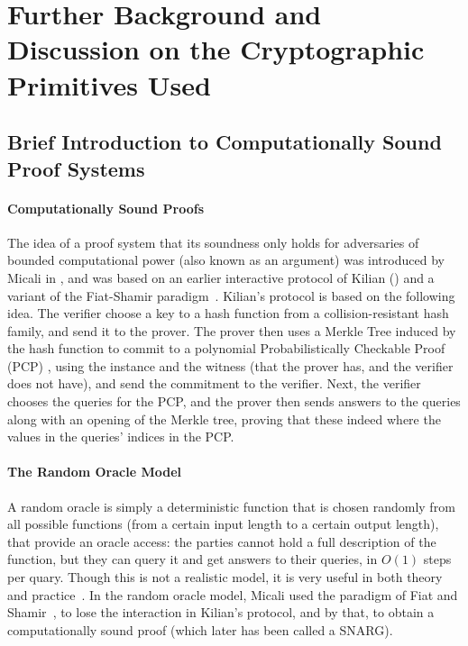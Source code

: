 \section{Further Background and Discussion on the Cryptographic Primitives Used}
\label{app:crypto}
\subsection{Brief Introduction to Computationally Sound Proof Systems}\label{app:crypto:background}
\paragraph{Computationally Sound Proofs}
The idea of a proof system that its soundness only holds for adversaries of bounded computational power (also known as an argument) was introduced by Micali in \cite{micali2000computationally}, and was based on an earlier interactive protocol of Kilian (\cite{kilian1992note}) and a variant of the Fiat-Shamir paradigm~\cite{fiat1986prove}.
Kilian's protocol is based on the following idea. The verifier choose a key to a hash function from a collision-resistant hash family, and send it to the prover. The prover then uses a Merkle Tree \cite{merkle1989certified} induced by the hash function to commit to a polynomial Probabilistically Checkable Proof (PCP) \cite{babai1991checking, arora1998probabilistic, arora1998proof, feige1991approximating}, using the instance and the witness (that the prover has, and the verifier does not have), and send the commitment to the verifier. Next, the verifier chooses the queries for the PCP, and the prover then sends answers to the queries along with an opening of the Merkle tree, proving that these indeed where the values in the queries' indices in the PCP.

\paragraph{The Random Oracle Model}
A random oracle is simply a deterministic function that is chosen randomly from all possible functions (from a certain input length to a certain output length), that provide an oracle access: the parties cannot hold a full description of the function, but they can query it and get answers to their queries, in $O(1)$ steps per quary. Though this is not a realistic model, it is very useful in both theory and practice~\cite{ROM93BMR}. In the random oracle model, Micali used the paradigm of Fiat and Shamir~\cite{fiat1986prove}, to lose the interaction in Kilian's protocol, and by that, to obtain a computationally sound proof (which later has been called a SNARG).


